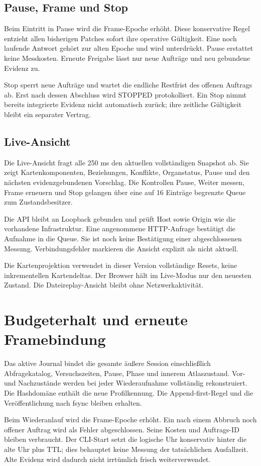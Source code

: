 \documentclass[11pt,a4paper]{article}
\newcommand{\nextsection}[2]{\clearpage{\color{accent}\small\textsf{#1}}\section{#2}}
\begin{document}
\subsection{Pause, Frame und Stop}
Beim Eintritt in Pause wird die Frame-Epoche erhöht. Diese konservative
Regel entzieht allen bisherigen Patches sofort ihre operative Gültigkeit.
Eine noch laufende Antwort gehört zur alten Epoche und wird unterdrückt.
Pause erstattet keine Messkosten. Erneute Freigabe lässt nur neue
Aufträge und neu gebundene Evidenz zu.

Stop sperrt neue Aufträge und wartet die endliche Restfrist des offenen
Auftrags ab. Erst nach dessen Abschluss wird STOPPED protokolliert.
Ein Stop nimmt bereits integrierte Evidenz nicht automatisch zurück;
ihre zeitliche Gültigkeit bleibt ein separater Vertrag.

\subsection{Live-Ansicht}
Die Live-Ansicht fragt alle 250 ms den aktuellen vollständigen Snapshot
ab. Sie zeigt Kartenkomponenten, Beziehungen, Konflikte, Organstatus,
Pause und den nächsten evidenzgebundenen Vorschlag. Die Kontrollen
Pause, Weiter messen, Frame erneuern und Stop gelangen über eine
auf 16 Einträge begrenzte Queue zum Zustandsbesitzer.

Die API bleibt an Loopback gebunden und prüft Host sowie Origin wie
die vorhandene Infrastruktur. Eine angenommene HTTP-Anfrage bestätigt
die Aufnahme in die Queue. Sie ist noch keine Bestätigung einer
abgeschlossenen Messung. Verbindungsfehler markieren die Ansicht
explizit als nicht aktuell.

Die Kartenprojektion verwendet in dieser Version vollständige Resets,
keine inkrementellen Kartendeltas. Der Browser hält im Live-Modus nur
den neuesten Zustand. Die Dateireplay-Ansicht bleibt ohne Netzwerkaktivität.

\nextsection{36 / WIEDERANLAUF}{Budgeterhalt und erneute Framebindung}
Das aktive Journal bindet die gesamte äußere Session einschließlich
Abfragekatalog, Versuchszeiten, Pause, Phase und innerem Atlaszustand.
Vor- und Nachzustände werden bei jeder Wiederaufnahme vollständig
rekonstruiert. Die Hashdomäne enthält die neue Profilkennung.
Die Append-first-Regel und die Veröffentlichung nach fsync bleiben erhalten.

Beim Wiederanlauf wird die Frame-Epoche erhöht. Ein nach einem
Abbruch noch offener Auftrag wird als Fehler abgeschlossen. Seine
Kosten und Auftrags-ID bleiben verbraucht. Der CLI-Start setzt die
logische Uhr konservativ hinter die alte Uhr plus TTL; dies behauptet
keine Messung der tatsächlichen Ausfallzeit. Alte Evidenz wird dadurch
nicht irrtümlich frisch weiterverwendet.
\end{document}
